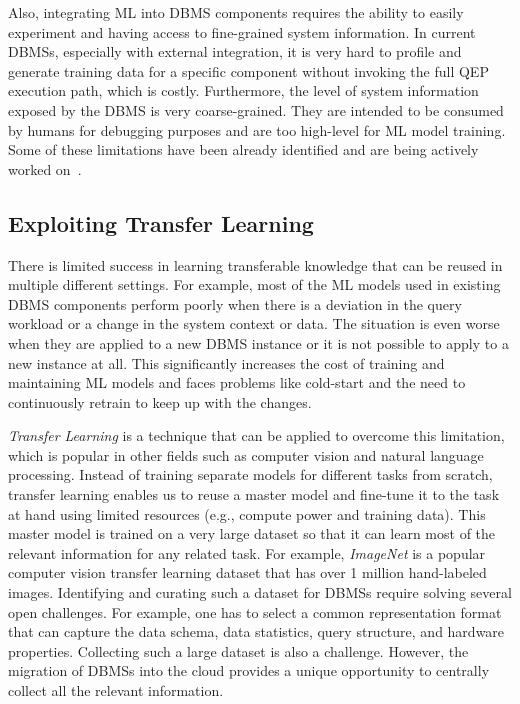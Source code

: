 Also, integrating ML into DBMS components requires the ability to easily experiment and having access to fine-grained system information.
In current DBMSs, especially with external integration, it is very hard to profile and generate training data for a specific component without invoking the full QEP execution path, which is costly.
Furthermore, the level of system information exposed by the DBMS is very coarse-grained.
They are intended to be consumed by humans for debugging purposes and are too high-level for ML model training.
Some of these limitations have been already identified and are being actively worked on~\cite{noisepage}.

\subsection{Exploiting Transfer Learning} There is limited success in learning transferable knowledge that can be reused in multiple different settings.
For example, most of the ML models used in existing DBMS components perform poorly when there is a deviation in the query workload or a change in the system context or data.
The situation is even worse when they are applied to a new DBMS instance or it is not possible to apply to a new instance at all.
This significantly increases the cost of training and maintaining ML models and faces problems like cold-start and the need to continuously retrain to keep up with the changes.

\textit{Transfer Learning} is a technique that can be applied to overcome this limitation, which is popular in other fields such as computer vision and natural language processing.
Instead of training separate models for different tasks from scratch, transfer learning enables us to reuse a master model and fine-tune it to the task at hand using limited resources (e.g., compute power and training data).
This master model is trained on a very large dataset so that it can learn most of the relevant information for any related task.
For example, \textit{ImageNet} is a popular computer vision transfer learning dataset that has over 1 million hand-labeled images.
Identifying and curating such a dataset for DBMSs require solving several open challenges.
For example, one has to select a common representation format that can capture the data schema, data statistics, query structure, and hardware properties.
Collecting such a large dataset is also a challenge.
However, the migration of DBMSs into the cloud provides a unique opportunity to centrally collect all the relevant information.